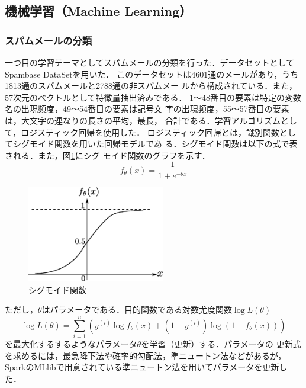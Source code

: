 \documentclass[a4paper,12pt]{jarticle}
\begin{document}
\subsection{機械学習（Machine Learning）}

\subsubsection{スパムメールの分類}
一つ目の学習テーマとしてスパムメールの分類を行った．データセットとして
Spambase DataSet\cite{Spam}を用いた．
このデータセットは4601通のメールがあり，うち1813通のスパムメールと2788通の非スパムメー
ルから構成されている．また，57次元のベクトルとして特徴量抽出済みである．
1〜48番目の要素は特定の変数名の出現頻度，49〜54番目の要素は記号文
字の出現頻度，55〜57番目の要素は，大文字の連なりの長さの平均，最長，
合計である．学習アルゴリズムとして，ロジスティック回帰を使用した．
ロジスティック回帰とは，識別関数としてシグモイド関数を用いた回帰モデルであ
る．シグモイド関数は以下の式で表される．また，図\ref{fig:sigmoid}にシグ
モイド関数のグラフを示す．
%
\begin{equation}
 f_\theta (x) = \frac{1}{1+e^{-\theta x}}
\end{equation}
%
\begin{figure}[bp]
 \begin{center}
  \includegraphics[width=60mm]{fig/sigmoid.eps}
  \caption{シグモイド関数}
  \label{fig:sigmoid}
 \end{center}
\end{figure}
%
ただし，$\theta$はパラメータである．目的関数である対数尤度関数$\log L(\theta)$
%
\begin{equation}
 \log L(\theta) = \sum^n_{i=1}(y^{(i)}\log f_\theta(x)+(1-y^{(i)})\log
  (1-f_\theta (x)))
\end{equation}
%
を最大化するするようなパラメータ$\theta$を学習（更新）する．パラメータの
更新式を求めるには，最急降下法や確率的勾配法，準ニュートン法などがあるが，
SparkのMLlibで用意されている準ニュートン法を用いてパラメータを更新した．
\end{document}
